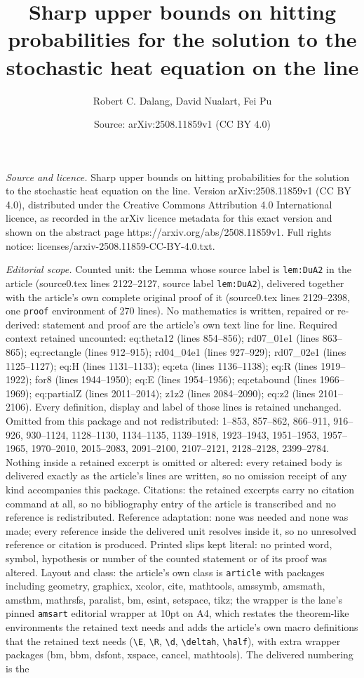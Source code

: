 \documentclass[10pt,a4paper]{amsart}
\title[Sharp upper bounds on hitting probabilities for the solution]{Sharp upper bounds on hitting probabilities for the solution to the stochastic heat equation on the line}
\author{Robert C. Dalang, David Nualart, Fei Pu}
\date{Source: arXiv:2508.11859v1 (CC BY 4.0)}
\begin{document}
\maketitle

\noindent\emph{Source and licence.} Sharp upper bounds on hitting probabilities for the solution to the stochastic heat equation on the line. Version arXiv:2508.11859v1 (CC BY 4.0), distributed under the Creative Commons Attribution 4.0 International licence, as recorded in the arXiv licence metadata for this exact version and shown on the abstract page https://arxiv.org/abs/2508.11859v1. Full rights notice: licenses/arxiv-2508.11859-CC-BY-4.0.txt.\par\smallskip

\noindent\textit{Editorial scope.} Counted unit: the Lemma whose source label is \texttt{lem:DuA2} in the article (source0.tex lines 2122--2127, source label \texttt{lem:DuA2}), delivered together with the article's own complete original proof of it (source0.tex lines 2129--2398, one \texttt{proof} environment of 270 lines). No mathematics is written, repaired or re-derived: statement and proof are the article's own text line for line. Required context retained uncounted: eq:theta12 (lines 854--856); rd07\_01e1 (lines 863--865); eq:rectangle (lines 912--915); rd04\_04e1 (lines 927--929); rd07\_02e1 (lines 1125--1127); eq:H (lines 1131--1133); eq:eta (lines 1136--1138); eq:R (lines 1919--1922); for8 (lines 1944--1950); eq:E (lines 1954--1956); eq:etabound (lines 1966--1969); eq:partialZ (lines 2011--2014); z1z2 (lines 2084--2090); eq:z2 (lines 2101--2106). Every definition, display and label of those lines is retained unchanged. Omitted from this package and not redistributed: 1--853, 857--862, 866--911, 916--926, 930--1124, 1128--1130, 1134--1135, 1139--1918, 1923--1943, 1951--1953, 1957--1965, 1970--2010, 2015--2083, 2091--2100, 2107--2121, 2128--2128, 2399--2784. Nothing inside a retained excerpt is omitted or altered: every retained body is delivered exactly as the article's lines are written, so no omission receipt of any kind accompanies this package. Citations: the retained excerpts carry no citation command at all, so no bibliography entry of the article is transcribed and no reference is redistributed. Reference adaptation: none was needed and none was made; every reference inside the delivered unit resolves inside it, so no unresolved reference or citation is produced. Printed slips kept literal: no printed word, symbol, hypothesis or number of the counted statement or of its proof was altered. Layout and class: the article's own class is \texttt{article} with packages including geometry, graphicx, xcolor, cite, mathtools, amssymb, amsmath, amsthm, mathrsfs, paralist, bm, esint, setspace, tikz; the wrapper is the lane's pinned \texttt{amsart} editorial wrapper at 10pt on A4, which restates the theorem-like environments the retained text needs and adds the article's own macro definitions that the retained text needs (\texttt{\textbackslash E}, \texttt{\textbackslash R}, \texttt{\textbackslash d}, \texttt{\textbackslash deltah}, \texttt{\textbackslash half}), with extra wrapper packages (bm, bbm, dsfont, xspace, cancel, mathtools). The delivered numbering is the 
\end{document}
